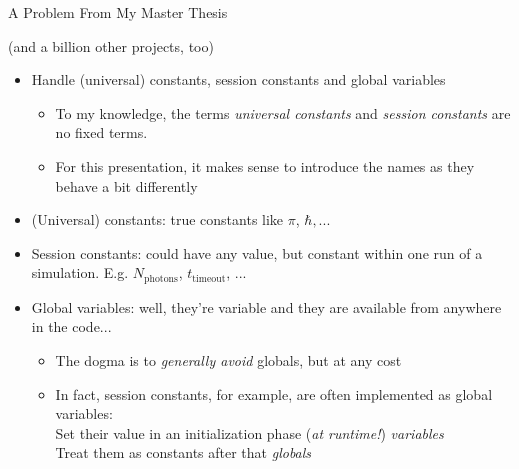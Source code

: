 \begin{frame}{A Problem From My Master Thesis}
%
\begin{center}
\tiny
(and a billion other projects, too)
\end{center}
%
\begin{itemize}
\item Handle (universal) constants, session constants and global variables
	\begin{itemize}
	\item To my knowledge, the terms \emph{universal constants} and \emph{session constants} are no fixed terms.
	\item For this presentation, it makes sense to introduce the names as they behave a bit differently
	\end{itemize}
\item (Universal) constants: true constants like $\pi$, $\hbar, ...$
\item Session constants: could have any value, but constant within one run of a simulation. E.\;g. $N_{\text{photons}}$, $t_{\text{timeout}}$, ...
\item Global variables: well, they're variable and they are available from anywhere in the code...
	\begin{itemize}
	\item The dogma is to \emph{generally avoid} globals, but at any cost
	\item In fact, session constants, for example, are often implemented as global variables: \\
		Set their value in an initialization phase (\emph{at runtime!}) \Thus \emph{variables}\\
		Treat them as constants after that \Thus \emph{globals}
	\end{itemize}
\end{itemize}
%
\end{frame}


